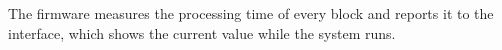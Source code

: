 The firmware measures the processing time of every block and reports it to the interface, which shows the current value while the system runs.
